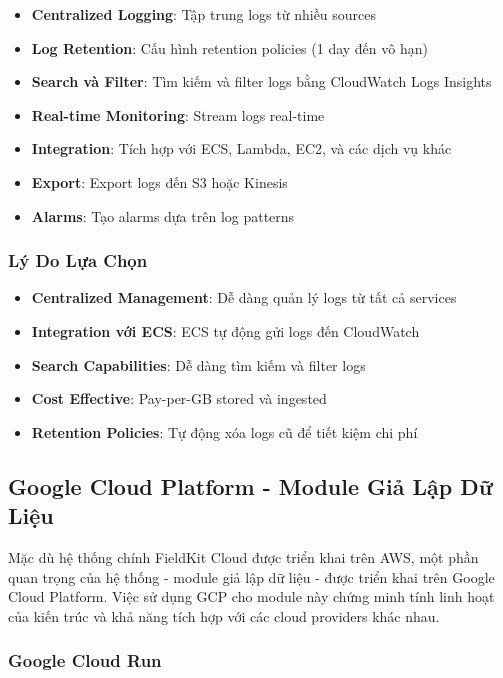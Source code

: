 \begin{itemize}
    \item \textbf{Centralized Logging}: Tập trung logs từ nhiều sources
    \item \textbf{Log Retention}: Cấu hình retention policies (1 day đến vô hạn)
    \item \textbf{Search và Filter}: Tìm kiếm và filter logs bằng CloudWatch Logs Insights
    \item \textbf{Real-time Monitoring}: Stream logs real-time
    \item \textbf{Integration}: Tích hợp với ECS, Lambda, EC2, và các dịch vụ khác
    \item \textbf{Export}: Export logs đến S3 hoặc Kinesis
    \item \textbf{Alarms}: Tạo alarms dựa trên log patterns
\end{itemize}

\subsubsection{Lý Do Lựa Chọn}

\begin{itemize}
    \item \textbf{Centralized Management}: Dễ dàng quản lý logs từ tất cả services
    \item \textbf{Integration với ECS}: ECS tự động gửi logs đến CloudWatch
    \item \textbf{Search Capabilities}: Dễ dàng tìm kiếm và filter logs
    \item \textbf{Cost Effective}: Pay-per-GB stored và ingested
    \item \textbf{Retention Policies}: Tự động xóa logs cũ để tiết kiệm chi phí
\end{itemize}

\subsection{Google Cloud Platform - Module Giả Lập Dữ Liệu}

Mặc dù hệ thống chính FieldKit Cloud được triển khai trên AWS, một phần quan trọng của hệ thống - module giả lập dữ liệu - được triển khai trên Google Cloud Platform. Việc sử dụng GCP cho module này chứng minh tính linh hoạt của kiến trúc và khả năng tích hợp với các cloud providers khác nhau.

\subsubsection{Google Cloud Run}

